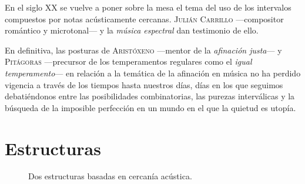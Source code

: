 \documentclass[a4paper,12pt]{article}
\begin{document}
\begin{multicols}{2}
  En el siglo XX se vuelve a poner sobre la mesa el tema del uso de los intervalos compuestos por notas acústicamente cercanas. \textsc{Julián Carrillo} ---compositor romántico y microtonal--- y la \emph{música espectral} dan testimonio de ello.

  En definitiva, las posturas de \textsc{Aristóxeno} ---mentor de la \emph{afinación justa}--- y \textsc{Pitágoras} ---precursor de los temperamentos regulares como el \emph{igual temperamento}--- en relación a la temática de la afinación en música no ha perdido vigencia a través de los tiempos hasta nuestros días, días en los que seguimos debatiéndonos entre las posibilidades combinatorias, las purezas interválicas y la búsqueda de la imposible perfección en un mundo en el que la quietud es utopía.

\section{Estructuras}\label{sec:estructuras}
\end{multicols}

\begin{figure}[ht]
\centering
{}
\caption{Dos estructuras basadas en cercanía acústica.}\label{fig:dos-estructuras}
\end{figure}
\end{document}
